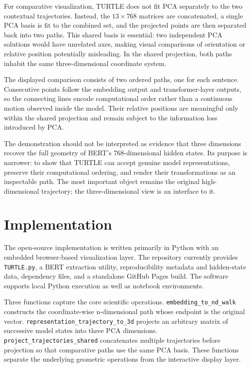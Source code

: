 \documentclass[manuscript,screen,nonacm]{acmart}
\begin{document}
For comparative visualization, TURTLE does not fit PCA separately to the two contextual trajectories. Instead, the \(13\times768\) matrices are concatenated, a single PCA basis is fit to the combined set, and the projected points are then separated back into two paths. This shared basis is essential: two independent PCA solutions would have unrelated axes, making visual comparisons of orientation or relative position potentially misleading. In the shared projection, both paths inhabit the same three-dimensional coordinate system.

The displayed comparison consists of two ordered paths, one for each sentence. Consecutive points follow the embedding output and transformer-layer outputs, so the connecting lines encode computational order rather than a continuous motion observed inside the model. Their relative positions are meaningful only within the shared projection and remain subject to the information loss introduced by PCA.

The demonstration should not be interpreted as evidence that three dimensions recover the full geometry of BERT's 768-dimensional hidden states. Its purpose is narrower: to show that TURTLE can accept genuine model representations, preserve their computational ordering, and render their transformations as an inspectable path. The most important object remains the original high-dimensional trajectory; the three-dimensional view is an interface to it.

\section{Implementation}\label{implementation}

The open-source implementation is written primarily in Python with an embedded browser-based visualization layer. The repository currently provides \nolinkurl{TURTLE.py}, a BERT extraction utility, reproducibility metadata and hidden-state data, dependency files, and a standalone GitHub Pages build. The software supports local Python execution as well as notebook environments.

Three functions capture the core scientific operations. \nolinkurl{embedding_to_nd_walk} constructs the coordinate-wise n-dimensional path whose endpoint is the original vector. \nolinkurl{representation_trajectory_to_3d} projects an arbitrary matrix of successive model states into three PCA dimensions. \nolinkurl{project_trajectories_shared} concatenates multiple trajectories before projection so that comparative paths use the same PCA basis. These functions separate the underlying geometric operations from the interactive display layer.
\end{document}
